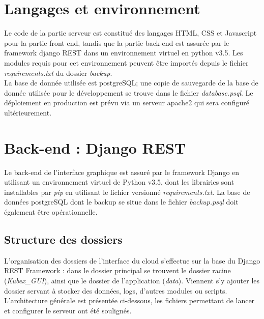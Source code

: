 \documentclass[a4paper]{report}
\begin{document}
\section{Langages et environnement}

Le code de la partie serveur est constitué des langages HTML, CSS et Javascript pour la partie front-end, tandis que la partie back-end est assurée par le framework django REST dans un environnement virtuel en python v3.5. Les modules requis pour cet environnement peuvent être importés depuis le fichier \emph{requirements.txt} du dossier \emph{backup}.\\

La base de donnée utilisée est postgreSQL; une copie de sauvegarde de la base de donnée utilisée pour le développement se trouve dans le fichier \emph{database.psql}. Le déploiement en production est prévu via un serveur apache2 qui sera configuré ultérieurement.


\section{Back-end : Django REST}
Le back-end de l'interface graphique est assuré par le framework Django  en utilisant un environnement virtuel de Python v3.5, dont les librairies sont installables par \emph{pip} en utilisant le fichier versionné \emph{requirements.txt}. La base de données postgreSQL dont le backup se situe dans le fichier \emph{backup.psql} doit également être opérationnelle.\\


\subsection{Structure des dossiers}
L'organisation des dossiers de l'interface du cloud s'effectue sur la base du Django REST Framework : dans le dossier principal se trouvent le dossier racine (\emph{Kubex\_GUI}), ainsi que le dossier de l'application (\emph{data}). Viennent s'y ajouter les dossier servant à stocker des données, logs, d'autres modules ou scripts.\\

L'architecture générale est présentée ci-dessous, les fichiers permettant de lancer et configurer le serveur ont été soulignés.
\end{document}
